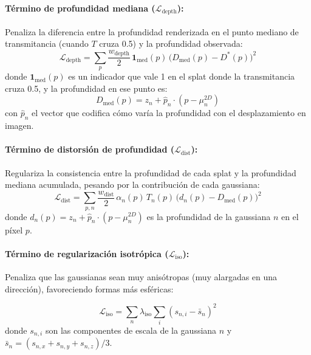 \paragraph{Término de profundidad mediana ($\mathcal{L}_{\text{depth}}$):}
Penaliza la diferencia entre la profundidad renderizada en el punto mediano de transmitancia (cuando $T$ cruza 0.5) y la profundidad observada:
\begin{equation}
\mathcal{L}_{\text{depth}} = \sum_{p} \frac{w_{\text{depth}}}{2}\, \mathbf{1}_{\text{med}}(p)\, \big(D_{\text{med}}(p) - D^*(p)\big)^2
\end{equation}
donde $\mathbf{1}_{\text{med}}(p)$ es un indicador que vale 1 en el splat donde la transmitancia cruza 0.5, y la profundidad en ese punto es:
\begin{equation}
D_{\text{med}}(p) = z_n + \hat{p}_n \cdot (p - \mu_n^{2D})
\end{equation}
con $\hat{p}_n$ el vector que codifica cómo varía la profundidad con el desplazamiento en imagen.

\paragraph{Término de distorsión de profundidad ($\mathcal{L}_{\text{dist}}$):}
Regulariza la consistencia entre la profundidad de cada splat y la profundidad mediana acumulada, pesando por la contribución de cada gaussiana:
\begin{equation}
\mathcal{L}_{\text{dist}} = \sum_{p,n} \frac{w_{\text{dist}}}{2}\, \alpha_n(p)\,T_n(p)\, \big(d_n(p)-D_{\text{med}}(p)\big)^2
\end{equation}
donde $d_n(p) = z_n + \hat{p}_n \cdot (p - \mu_n^{2D})$ es la profundidad de la gaussiana $n$ en el píxel $p$.

\paragraph{Término de regularización isotrópica ($\mathcal{L}_{\text{iso}}$):}

Penaliza que las gaussianas sean muy anisótropas (muy alargadas en una dirección), favoreciendo formas más esféricas:

\begin{equation}
\mathcal{L}_{\text{iso}} = \sum_{n} \lambda_{\text{iso}}\sum_{i} (s_{n,i} - \bar{s}_n)^2
\end{equation}
donde $s_{n,i}$ son las componentes de escala de la gaussiana $n$ y $\bar{s}_n = (s_{n,x} + s_{n,y} + s_{n,z})/3$.


